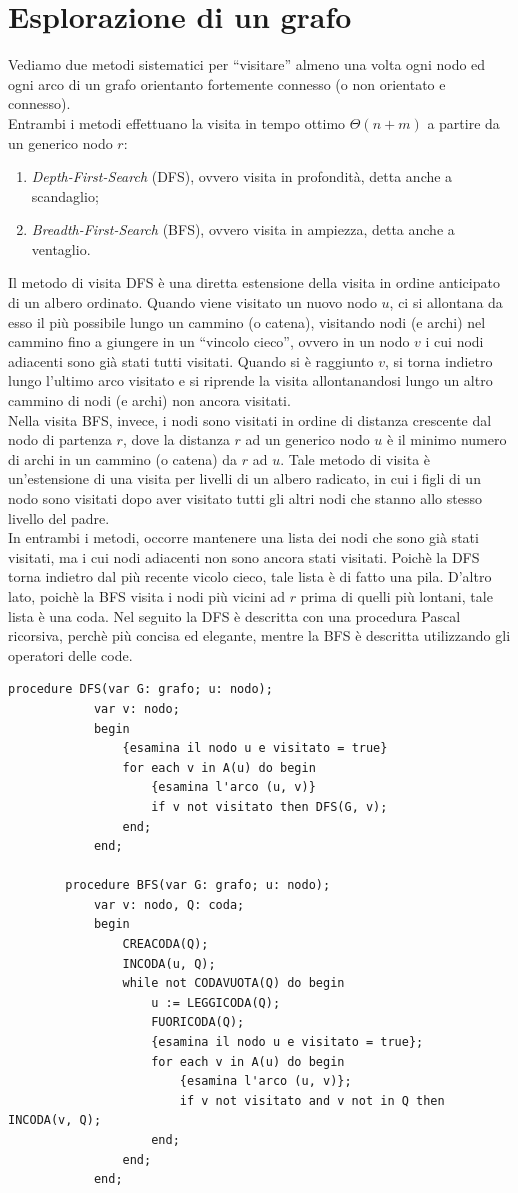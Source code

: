 \documentclass[12pt]{report}
\begin{document}
   	\section{Esplorazione di un grafo}
   	Vediamo due metodi sistematici per ``visitare'' almeno una volta ogni nodo ed ogni arco di un grafo orientanto fortemente connesso (o non orientato e connesso). \\
   	Entrambi i metodi effettuano la visita in tempo ottimo $\Theta(n + m)$ a partire da un generico nodo $r$:
   	\begin{enumerate}
   		\item \textit{Depth-First-Search} (DFS), ovvero visita in profondità, detta anche a scandaglio;
   		\item \textit{Breadth-First-Search} (BFS), ovvero visita in ampiezza, detta anche a ventaglio.
   	\end{enumerate}
   	Il metodo di visita DFS è una diretta estensione della visita in ordine anticipato di un albero ordinato. Quando viene visitato un nuovo nodo $u$, ci si allontana da esso il più possibile lungo un cammino (o catena), visitando nodi (e archi) nel cammino fino a giungere in un ``vincolo cieco'', ovvero in un nodo $v$ i cui nodi adiacenti sono già stati tutti visitati. Quando si è raggiunto $v$, si torna indietro lungo l'ultimo arco visitato e si riprende la visita allontanandosi lungo un altro cammino di nodi (e archi) non ancora visitati. \\
   	Nella visita BFS, invece, i nodi sono visitati in ordine di distanza crescente dal nodo di partenza $r$, dove la distanza $r$ ad un generico nodo $u$ è il minimo numero di archi in un cammino (o catena) da $r$ ad $u$. Tale metodo di visita è un'estensione di una visita per livelli di un albero radicato, in cui i figli di un nodo sono visitati dopo aver visitato tutti gli altri nodi che stanno allo stesso livello del padre. \\
   	In entrambi i metodi, occorre mantenere una lista dei nodi che sono già stati visitati, ma i cui nodi adiacenti non sono ancora stati visitati. Poichè la DFS torna indietro dal più recente vicolo cieco, tale lista è di fatto una pila. D'altro lato, poichè la BFS visita i nodi più vicini ad $r$ prima di quelli più lontani, tale lista è una coda. Nel seguito la DFS è descritta con una procedura Pascal ricorsiva, perchè più concisa ed elegante, mentre la BFS è descritta utilizzando gli operatori delle code.
   	\begin{lstlisting}[style=pascalstyle]
   		procedure DFS(var G: grafo; u: nodo);
   			var v: nodo;
   			begin
   				{esamina il nodo u e visitato = true}
   				for each v in A(u) do begin
   					{esamina l'arco (u, v)}
   					if v not visitato then DFS(G, v);
   				end;
   			end;

   		procedure BFS(var G: grafo; u: nodo);
   			var v: nodo, Q: coda;
   			begin
   				CREACODA(Q);
   				INCODA(u, Q);
   				while not CODAVUOTA(Q) do begin
   					u := LEGGICODA(Q);
   					FUORICODA(Q);
   					{esamina il nodo u e visitato = true};
   					for each v in A(u) do begin
   						{esamina l'arco (u, v)};
   						if v not visitato and v not in Q then INCODA(v, Q);
   					end;
   				end;
   			end;
   	\end{lstlisting}
\end{document}
